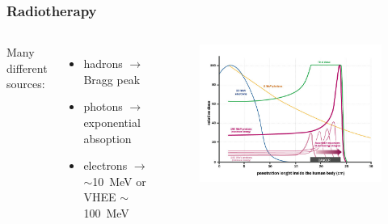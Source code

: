  




    \begin{frame}[noframenumbering]
        \frametitle{Radiotherapy}
        \begin{columns}
            Many different sources: 
            \begin{itemize}
                \item hadrons $\rightarrow$ Bragg peak 
                \item photons $\rightarrow$ exponential absoption
                \item electrons $\rightarrow$ $\sim$\SI{10}{MeV} or VHEE $\sim$\SI{100}{MeV}
            \end{itemize}
                \begin{figure}[h!]
                    \centering
                    \includegraphics[width=1.\linewidth]{figures/pixel_detectors_usage/Bragg-Peak.png}
                \end{figure}
        \end{columns}
    \end{frame} 

